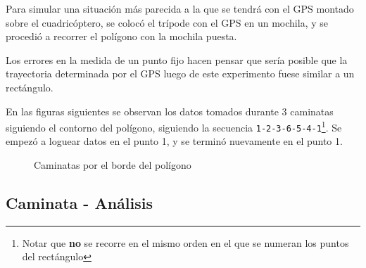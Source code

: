 \documentclass[main]{subfiles}
\begin{document}
Para simular una situación más parecida a la que se tendrá con el GPS montado sobre el cuadricóptero, se colocó el trípode con el GPS en un mochila, y se procedió a recorrer el polígono con la mochila puesta.

Los errores en la medida de un punto fijo hacen pensar que sería posible que la trayectoria determinada por el GPS luego de este experimento fuese similar a un rectángulo.

En las figuras siguientes se observan los datos tomados durante 3 caminatas siguiendo el contorno del polígono, siguiendo la secuencia \verb+1-2-3-6-5-4-1+\footnote{Notar que \textbf{no} se recorre en el mismo orden en el que se numeran los puntos del rectángulo}. Se empezó a loguear datos en el punto 1, y se terminó nuevamente en el punto 1.

\begin{figure} [h!]
\vspace{-10pt}
  \centering
  \label{fig:caminatas}
\caption{Caminatas por el borde del polígono}
\vspace{-20pt}
\end{figure}

\newpage
\subsection{Caminata - Análisis}
\label{sec:caminata-analisis}
\end{document}
